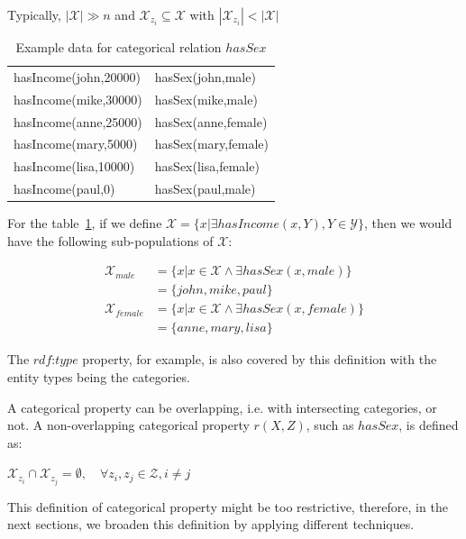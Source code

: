 Typically, $|\mathcal{X}| \gg n$ and $\mathcal{X}_{z_i} \subseteq
\mathcal{X}$ with $|\mathcal{X}_{z_i}| < |\mathcal{X}|$

\begin{table}[h!]
 \label{tab:cat1}
 \begin{center}
 \caption{Example data for categorical relation $hasSex$}
  \begin{tabular}{*{2}{l}}
    \toprule
    hasIncome(john,20000) & hasSex(john,male) 	\\
    hasIncome(mike,30000) & hasSex(mike,male) 	\\
    hasIncome(anne,25000) & hasSex(anne,female) 	\\
    hasIncome(mary,5000)  & hasSex(mary,female) 	\\
    hasIncome(lisa,10000) & hasSex(lisa,female)	\\
    hasIncome(paul,0)	  & hasSex(paul,male)	\\
    \bottomrule
  \end{tabular}
  \end{center}
\end{table}
  
For the table~\ref{tab:cat1}, if we define $\mathcal{X}=\{ x|\exists hasIncome(x,Y), Y \in \mathcal{Y} \}$, then we
would
have the following sub-populations of $\mathcal{X}$:

\begin{align*}
 \mathcal{X}_{male}&=\{ x|x \in \mathcal{X} \wedge \exists hasSex(x,male)\} \\
  &=\{john,mike,paul\} \\
\mathcal{X}_{female}&=\{ x|x \in \mathcal{X} \wedge \exists hasSex(x,female)\} \\
  &=\{anne,mary,lisa\}
\end{align*}


The $rdf$:$type$ property, for example, is also covered by this definition with the entity types being the categories.

A categorical property can be overlapping, i.e. with intersecting categories, or not. A non-overlapping categorical
property $r(X,Z)$, such as $hasSex$, is defined as:

\begin{center}
$\mathcal{X}_{z_i} \cap \mathcal{X}_{z_j} = \emptyset, \quad \forall z_i,z_j \in \mathcal{Z}, i \neq j$ 
\end{center}

This definition of categorical property might be too restrictive, therefore, in the next sections, we broaden this
definition by applying different techniques.

